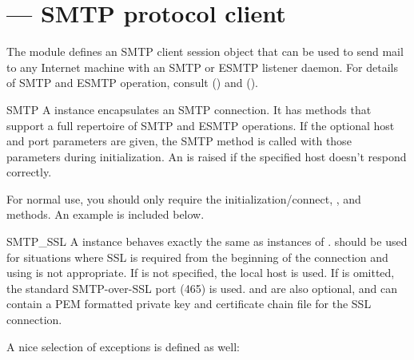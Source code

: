 \section{ ---
         SMTP protocol client}



The  module defines an SMTP client session object that
can be used to send mail to any Internet machine with an SMTP or ESMTP
listener daemon.  For details of SMTP and ESMTP operation, consult
 () and 
().

\begin{classdesc}{SMTP}{}
A  instance encapsulates an SMTP connection.  It has
methods that support a full repertoire of SMTP and ESMTP
operations. If the optional host and port parameters are given, the
SMTP  method is called with those parameters during
initialization.  An  is raised if the
specified host doesn't respond correctly.

For normal use, you should only require the initialization/connect,
, and  methods.  An example is
included below.
\end{classdesc}

\begin{classdesc}{SMTP_SSL}{}
A  instance behaves exactly the same as instances of .
 should be used for situations where SSL is required from 
the beginning of the connection and using  is not appropriate.
If  is not specified, the local host is used. If  is
omitted, the standard SMTP-over-SSL port (465) is used.  and 
are also optional, and can contain a PEM formatted private key and
certificate chain file for the SSL connection.
\end{classdesc}

A nice selection of exceptions is defined as well:

